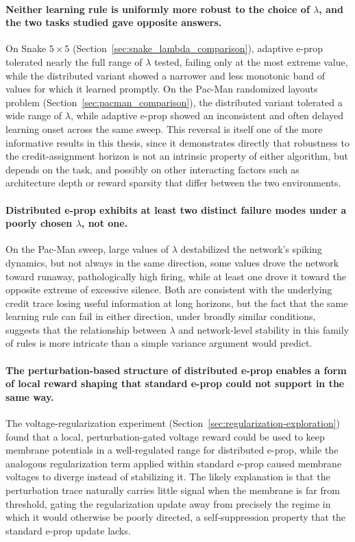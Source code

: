 \paragraph{Neither learning rule is uniformly more robust to the choice of
$\lambda$, and the two tasks studied gave opposite answers.} On Snake
$5\times5$ (Section~\ref{sec:snake_lambda_comparison}), adaptive e-prop
tolerated nearly the full range of $\lambda$ tested, failing only at the
most extreme value, while the distributed variant showed a narrower and
less monotonic band of values for which it learned promptly. On the
Pac-Man randomized layouts problem
(Section~\ref{sec:pacman_comparison}), the
distributed variant tolerated a wide range of $\lambda$, while adaptive
e-prop showed an inconsistent and often delayed learning onset across the
same sweep. This reversal is itself one of the more informative results
in this thesis, since it demonstrates directly that robustness to the
credit-assignment horizon is not an intrinsic property of either
algorithm, but depends on the task, and possibly on other interacting
factors such as architecture depth or reward sparsity that differ between
the two environments.

\paragraph{Distributed e-prop exhibits at least two distinct failure modes
under a poorly chosen $\lambda$, not one.} On the Pac-Man sweep, large
values of $\lambda$ destabilized the network's spiking dynamics, but not
always in the same direction, some values drove the network toward
runaway, pathologically high firing, while at least one drove it toward
the opposite extreme of excessive silence. Both are consistent with the
underlying credit trace losing useful information at long horizons, but
the fact that the same learning rule can fail in either direction, under
broadly similar conditions, suggests that the relationship between
$\lambda$ and network-level stability in this family of rules is more
intricate than a simple variance argument would predict.

\paragraph{The perturbation-based structure of distributed e-prop enables a
form of local reward shaping that standard e-prop could not support in
the same way.} The voltage-regularization experiment
(Section~\ref{sec:regularization-exploration}) found that a local,
perturbation-gated voltage reward could be used to keep membrane
potentials in a well-regulated range for distributed e-prop, while the
analogous regularization term applied within standard e-prop caused
membrane voltages to diverge instead of stabilizing it. The likely explanation
is that the perturbation trace naturally carries little signal when the
membrane is far from threshold, gating the regularization update away
from precisely the regime in which it would otherwise be poorly directed,
a self-suppression property that the standard e-prop update lacks.

